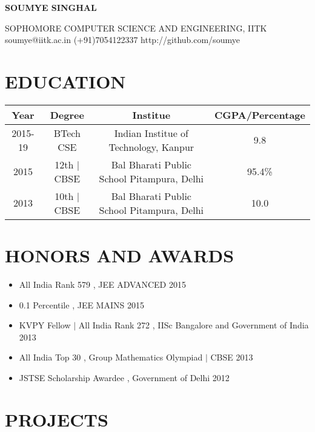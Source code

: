\documentclass{article}
\begin{document}
    \centerline{\Huge{\textbf{SOUMYE SINGHAL}}}
    \begin{center}
    \textup{
        SOPHOMORE {\large\textperiodcentered} COMPUTER SCIENCE AND ENGINEERING, IITK\\
    }
    soumye@iitk.ac.in {\large\textperiodcentered} (+91)7054122337 {\large\textperiodcentered} http://github.com/soumye
    \end{center}


\begin{table}[h]
\section*{EDUCATION}
    \begin{tabular}{ |c|c|c|c| } 
        \hline
        Year & Degree & Institue & CGPA/Percentage \\ 
        \hline
        2015-19 & BTech CSE & Indian Institue of Technology, Kanpur & 9.8\\ 
        2015 & 12th $|$ CBSE & Bal Bharati Public School Pitampura, Delhi & 95.4\%\\ 
        2013 & 10th $|$ CBSE & Bal Bharati Public School Pitampura, Delhi & 10.0\\        
        \hline
    \end{tabular}
\end{table}

\section*{HONORS AND AWARDS}
\begin{itemize}
    \itemsep0em
    \item All India Rank 579 , JEE ADVANCED \hfill 2015
    \item 0.1 Percentile , JEE MAINS \hfill 2015
    \item KVPY Fellow $|$ All India Rank 272 , IISc Bangalore and Government of India \hfill 2013
    \item All India Top 30 , Group Mathematics Olympiad $|$ CBSE \hfill 2013
    \item JSTSE Scholarship Awardee , Government of Delhi   \hfill 2012 
    \end{itemize}
\section*{PROJECTS}
\end{document}
